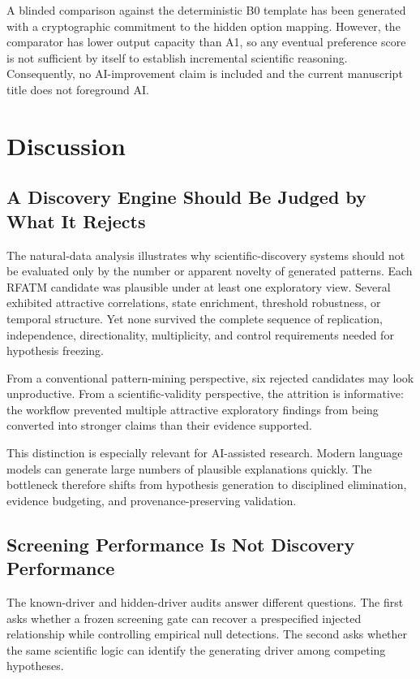 \documentclass{ieeeaccess}
\begin{document}
A blinded comparison against the deterministic B0 template has been generated with a cryptographic commitment to the hidden option mapping. However, the comparator has lower output capacity than A1, so any eventual preference score is not sufficient by itself to establish incremental scientific reasoning. Consequently, no AI-improvement claim is included and the current manuscript title does not foreground AI.

\section{Discussion}\label{discussion}

\subsection{A Discovery Engine Should Be Judged by What It Rejects}\label{a-discovery-engine-should-be-judged-by-what-it-rejects}

The natural-data analysis illustrates why scientific-discovery systems should not be evaluated only by the number or apparent novelty of generated patterns. Each RFATM candidate was plausible under at least one exploratory view. Several exhibited attractive correlations, state enrichment, threshold robustness, or temporal structure. Yet none survived the complete sequence of replication, independence, directionality, multiplicity, and control requirements needed for hypothesis freezing.

From a conventional pattern-mining perspective, six rejected candidates may look unproductive. From a scientific-validity perspective, the attrition is informative: the workflow prevented multiple attractive exploratory findings from being converted into stronger claims than their evidence supported.

This distinction is especially relevant for AI-assisted research. Modern language models can generate large numbers of plausible explanations quickly. The bottleneck therefore shifts from hypothesis generation to disciplined elimination, evidence budgeting, and provenance-preserving validation.

\subsection{Screening Performance Is Not Discovery Performance}\label{screening-performance-is-not-discovery-performance}

The known-driver and hidden-driver audits answer different questions. The first asks whether a frozen screening gate can recover a prespecified injected relationship while controlling empirical null detections. The second asks whether the same scientific logic can identify the generating driver among competing hypotheses.
\end{document}
